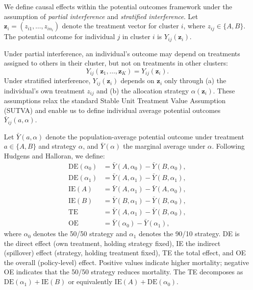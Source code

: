 \documentclass[12pt]{article}
\begin{document}
We define causal effects within the potential outcomes framework under the assumption of \textit{partial interference}\cite{hudgens_toward_2008,sobel_what_2006} and \textit{stratified interference}.\cite{hudgens_toward_2008} Let $\mathbf{z}_i = (z_{i1}, \ldots, z_{in_i})$ denote the treatment vector for cluster $i$, where $z_{ij} \in \{A, B\}$. The potential outcome for individual $j$ in cluster $i$ is $Y_{ij}(\mathbf{z}_i)$.

Under partial interference, an individual's outcome may depend on treatments assigned to others in their cluster, but not on treatments in other clusters:
\begin{equation}
Y_{ij}(\mathbf{z}_1, \ldots, \mathbf{z}_K) = Y_{ij}(\mathbf{z}_i).
\end{equation}
Under stratified interference, $Y_{ij}(\mathbf{z}_i)$ depends on $\mathbf{z}_i$ only through (a) the individual's own treatment $z_{ij}$ and (b) the allocation strategy $\alpha(\mathbf{z}_i)$. These assumptions relax the standard Stable Unit Treatment Value Assumption (SUTVA) and enable us to define individual average potential outcomes $\bar{Y}_{ij}(a, \alpha)$.

Let $\bar{Y}(a, \alpha)$ denote the population-average potential outcome under treatment $a \in \{A, B\}$ and strategy $\alpha$, and $\bar{Y}(\alpha)$ the marginal average under $\alpha$. Following Hudgens and Halloran,\cite{hudgens_toward_2008} we define:
\begin{align}
\mathrm{DE}(\alpha_0) &= \bar{Y}(A, \alpha_0) - \bar{Y}(B, \alpha_0), \label{eq:de0}\\
\mathrm{DE}(\alpha_1) &= \bar{Y}(A, \alpha_1) - \bar{Y}(B, \alpha_1), \label{eq:de1}\\
\mathrm{IE}(A) &= \bar{Y}(A, \alpha_1) - \bar{Y}(A, \alpha_0), \label{eq:iea}\\
\mathrm{IE}(B) &= \bar{Y}(B, \alpha_1) - \bar{Y}(B, \alpha_0), \label{eq:ieb}\\
\mathrm{TE} &= \bar{Y}(A, \alpha_1) - \bar{Y}(B, \alpha_0), \label{eq:te}\\
\mathrm{OE} &= \bar{Y}(\alpha_0) - \bar{Y}(\alpha_1), \label{eq:oe}
\end{align}
where $\alpha_0$ denotes the 50/50 strategy and $\alpha_1$ denotes the 90/10 strategy. DE is the direct effect (own treatment, holding strategy fixed), IE the indirect (spillover) effect (strategy, holding treatment fixed), TE the total effect, and OE the overall (policy-level) effect. Positive values indicate higher mortality; negative OE indicates that the 50/50 strategy reduces mortality. The TE decomposes as $\mathrm{DE}(\alpha_1) + \mathrm{IE}(B)$ or equivalently $\mathrm{IE}(A) + \mathrm{DE}(\alpha_0)$.
\end{document}
